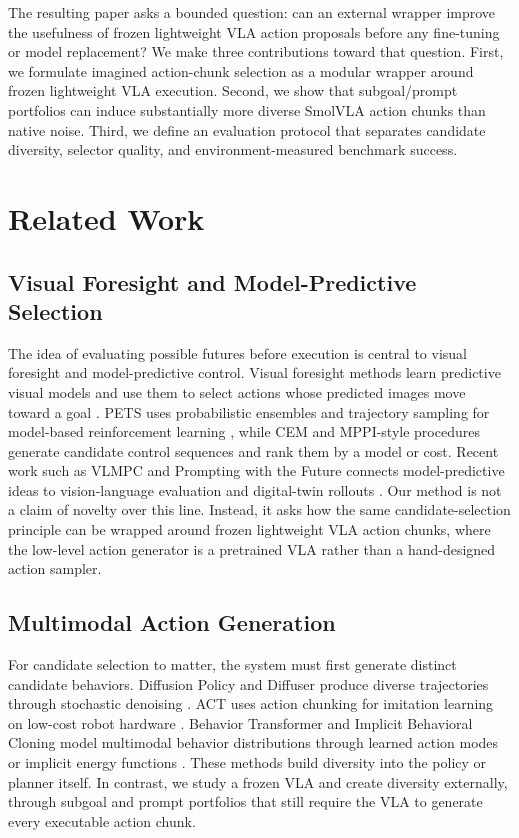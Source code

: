 \documentclass[conference]{IEEEtran}
\begin{document}
The resulting paper asks a bounded question: can an external wrapper improve
the usefulness of frozen lightweight VLA action proposals before any
fine-tuning or model replacement? We make three contributions toward that
question. First, we formulate imagined action-chunk selection as a modular
wrapper around frozen lightweight VLA execution. Second, we show that
subgoal/prompt portfolios can induce substantially more diverse SmolVLA action
chunks than native noise. Third, we define an evaluation protocol that
separates candidate diversity, selector quality, and environment-measured
benchmark success.

\section{Related Work}

\subsection{Visual Foresight and Model-Predictive Selection}

The idea of evaluating possible futures before execution is central to visual
foresight and model-predictive control. Visual foresight methods learn
predictive visual models and use them to select actions whose predicted images
move toward a goal \cite{ebert2018visualforesight}. PETS uses probabilistic
ensembles and trajectory sampling for model-based reinforcement learning
\cite{chua2018pets}, while CEM and MPPI-style procedures generate candidate
control sequences and rank them by a model or cost. Recent work such as VLMPC
and Prompting with the Future connects model-predictive ideas to
vision-language evaluation and digital-twin rollouts
\cite{zhao2024vlmpc,ning2025promptingfuture}. Our method is not a claim of
novelty over this line. Instead, it asks how the same candidate-selection
principle can be wrapped around frozen lightweight VLA action chunks, where
the low-level action generator is a pretrained VLA rather than a hand-designed
action sampler.

\subsection{Multimodal Action Generation}

For candidate selection to matter, the system must first generate distinct
candidate behaviors. Diffusion Policy and Diffuser produce diverse trajectories
through stochastic denoising \cite{chi2023diffusionpolicy,janner2022diffuser}.
ACT uses action chunking for imitation learning on low-cost robot hardware
\cite{zhao2023aloha}. Behavior Transformer and Implicit Behavioral Cloning
model multimodal behavior distributions through learned action modes or
implicit energy functions \cite{shafiullah2022bet,florence2021ibc}. These
methods build diversity into the policy or planner itself. In contrast, we
study a frozen VLA and create diversity externally, through subgoal and prompt
portfolios that still require the VLA to generate every executable action
chunk.
\end{document}

